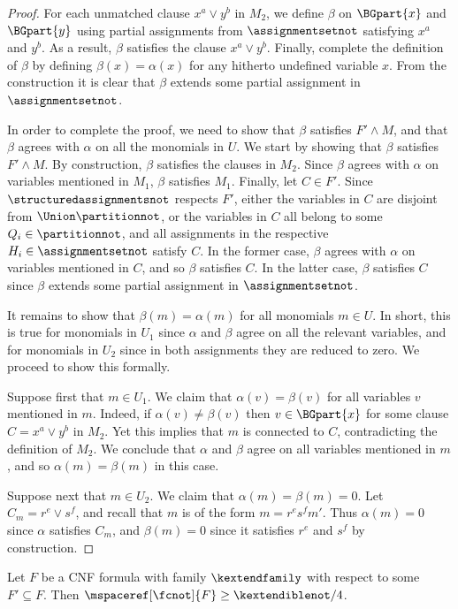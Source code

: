 \documentclass{toc}
\begin{document}
\begin{proof}
For each unmatched clause $x^a \lor y^b$ in $M_2$, we define $\beta$ on $\BGpart{x}$ and $\BGpart{y}$ using partial assignments from $\assignmentsetnot$ satisfying $x^a$ and $y^b$. As a result, $\beta$ satisfies the clause $x^a \lor y^b$. Finally, complete the definition of $\beta$ by defining $\beta(x) = \alpha(x)$ for any hitherto undefined variable $x$. From the construction it is clear that $\beta$ extends some partial assignment in $\assignmentsetnot$.

In order to complete the proof, we need to show that $\beta$ satisfies $F' \land M$, and that $\beta$ agrees with $\alpha$ on all the monomials in $U$. We start by showing that $\beta$ satisfies $F' \land M$. By construction, $\beta$ satisfies the clauses in $M_2$. Since $\beta$ agrees with $\alpha$ on variables mentioned in $M_1$, $\beta$ satisfies $M_1$. Finally, let $C \in F'$. Since $\structuredassignmentsnot$ respects $F'$, either the variables in $C$ are disjoint from $\Union \partitionnot$, or the variables in $C$ all belong to some $Q_i \in \partitionnot$, and all assignments in the respective $H_i \in \assignmentsetnot$ satisfy $C$. In the former case, $\beta$ agrees with $\alpha$ on variables mentioned in $C$, and so $\beta$ satisfies $C$. In the latter case, $\beta$ satisfies $C$ since $\beta$ extends some partial assignment in $\assignmentsetnot$.

It remains to show that $\beta(m) = \alpha(m)$ for all monomials $m \in U$. In short, this is true for monomials in $U_1$ since $\alpha$ and $\beta$ agree on all the relevant variables, and for monomials in $U_2$ since in both assignments they are reduced to zero. We proceed to show this formally.

Suppose first that $m \in U_1$. We claim that $\alpha(v) = \beta(v)$ for all variables $v$ mentioned in $m$. Indeed, if $\alpha(v) \neq \beta(v)$ then $v \in \BGpart{x}$ for some clause $C = x^a \lor y^b$ in $M_2$. Yet this implies that $m$ is connected to $C$, contradicting the definition of $M_2$. We conclude that $\alpha$ and $\beta$ agree on all variables mentioned in $m$, and so $\alpha(m) = \beta(m)$ in this case.

Suppose next that $m \in U_2$. 
We claim that $\alpha(m) = \beta(m) = 0$. Let $C_m = r^e \lor s^f$,
and recall that $m$ is of the form $m = r^e s^f m'$. 
Thus $\alpha(m) = 0$ since $\alpha$ satisfies $C_m$, and $\beta(m) =0$ 
since it satisfies $r^e$ and $s^f$ by construction.
\end{proof}

\begin{theorem}
  Let $F$ be a CNF formula with \akextendible family $\kextendfamily$
  with respect to some $F'\subseteq F$. Then
  $\mspaceref[\fcnot]{F}\geq \kextendiblenot/4$.
\end{theorem}
\end{document}
